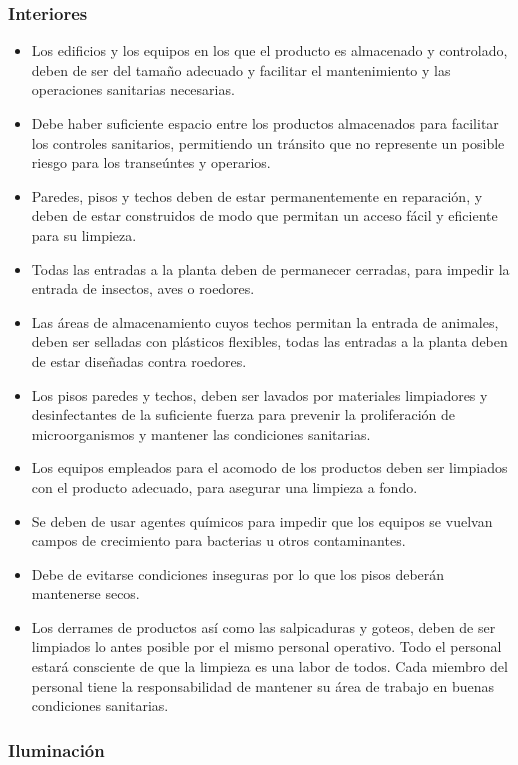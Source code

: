 \subsubsection{Interiores}

\begin{itemize}
	\item Los edificios y los equipos en los que el producto es almacenado y controlado, deben de ser del tamaño adecuado y facilitar el mantenimiento y las operaciones sanitarias necesarias.
	\item Debe haber suficiente espacio entre los productos almacenados para facilitar los controles sanitarios, permitiendo un tránsito que no represente un posible riesgo para los transeúntes y operarios.
	\item Paredes, pisos y techos deben de estar permanentemente en reparación, y deben de estar construidos de modo que permitan un acceso fácil y eficiente para su limpieza.
	\item Todas las entradas a la planta deben de permanecer cerradas, para impedir la entrada de insectos, aves o roedores.
	\item Las áreas de almacenamiento cuyos techos permitan la entrada de animales, deben ser selladas con plásticos flexibles, todas las entradas a la planta deben de estar diseñadas contra roedores.
	\item Los pisos paredes y techos, deben ser lavados por materiales limpiadores y desinfectantes de la suficiente fuerza para prevenir la proliferación de microorganismos y mantener las condiciones sanitarias.
	\item Los equipos empleados para el acomodo de los productos deben ser limpiados con el producto adecuado, para asegurar una limpieza a fondo.
	\item Se deben de usar agentes químicos para impedir que los equipos se vuelvan campos de crecimiento para bacterias u otros contaminantes.
	\item Debe de evitarse condiciones inseguras por lo que los pisos deberán mantenerse secos.
	\item Los derrames de productos así como las salpicaduras y goteos, deben de ser limpiados lo antes posible por el mismo personal operativo. Todo el personal estará consciente de que la limpieza es una labor de todos. Cada miembro del personal tiene la responsabilidad de mantener su área de trabajo en buenas condiciones sanitarias.
\end{itemize}

\subsubsection{Iluminación}

